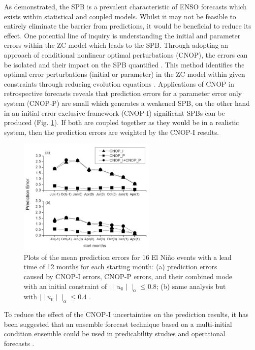 \documentclass[12pt, onecolumn]{revtex4}    %
\begin{document}
As demonstrated, the SPB is a prevalent characteristic of ENSO forecasts which exists within statistical and coupled models. Whilst it may not be feasible to entirely eliminate the barrier from predictions, it would be beneficial to reduce its effect. One potential line of inquiry is understanding the initial and parameter errors within the ZC model which leads to the SPB. Through adopting an approach of conditional nonlinear optimal perturbations (CNOP), the errors can be isolated and their impact on the SPB quantified \citep{duan2009exploring}. This method identifies the optimal error perturbations (initial or parameter) in the ZC model within given constraints through reducing evolution equations \citep{mu2010extension}. Applications of CNOP in retrospective forecasts reveals that prediction errors for a parameter error only system (CNOP-P) are small which generates a weakened SPB, on the other hand in an initial error exclusive framework (CNOP-I) significant SPBs can be produced (Fig. \ref{fig:cnop}). If both are coupled together as they would be in a realistic system, then the prediction errors are weighted by the CNOP-I results. \\

\begin{figure}
\includegraphics[width=0.6\textwidth]{data/cnop}
\caption[CNOP]{Plots of the mean prediction errors for 16 El Ni\~{n}o events with a lead time of 12 months for each starting month: (a) prediction errors caused by CNOP-I errors, CNOP-P errors, and their combined mode with an initial constraint of $\mid \mid u_0 \mid \mid _\alpha \leq 0.8$; (b) same analysis but with $\mid \mid u_0 \mid \mid _\alpha \leq 0.4$ \citep{yu2012does}.}
\label{fig:cnop}
\end{figure}

To reduce the effect of the CNOP-I uncertainties on the prediction results, it has been suggested that an ensemble forecast technique based on a multi-initial condition ensemble could be used in predicability studies and operational forecasts \citep{kirtman2001current}.
\end{document}
